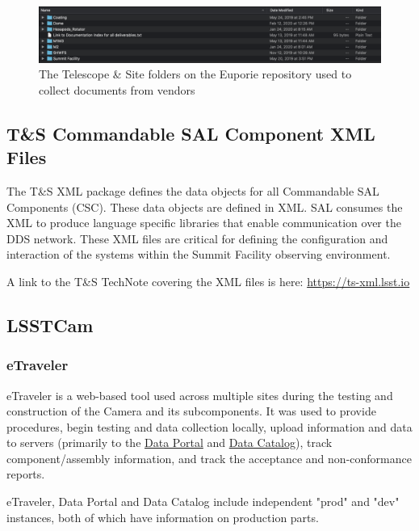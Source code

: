 \begin{figure}
\begin{center}
  \includegraphics[scale=0.33]{Figures/EuporieTS.png}
\end{center}
\caption{\label{fig:EuporyTS} The Telescope \& Site folders on the Euporie repository used to collect documents from vendors}
\end{figure}

\subsection{T\&S Commandable SAL Component XML Files}

The T\&S XML package defines the data objects for all Commandable SAL Components (CSC). These data objects are defined in XML. SAL consumes the XML to produce language specific libraries that enable communication over the DDS network.  These XML files are critical for defining the configuration and interaction of the systems within the Summit Facility observing environment.

A link to the T\&S TechNote covering the XML files is here: \url{https://ts-xml.lsst.io}

\subsection{LSSTCam}
	\subsubsection{eTraveler}
	eTraveler is a web-based tool used across multiple sites during the testing and construction of the Camera and its subcomponents. It was used to provide procedures, begin testing and data collection locally, upload information and data to servers (primarily to the \href{http://lsst-camera.slac.stanford.edu/DataPortal/}{Data Portal} and \href{http://srs.slac.stanford.edu/DataCatalog/?experiment=LSST-CAMERA}{Data Catalog}), track component/assembly information, and track the acceptance and non-conformance reports.
	
	eTraveler, Data Portal and Data Catalog include independent "prod" and "dev" instances, both of which have information on production parts.
	
